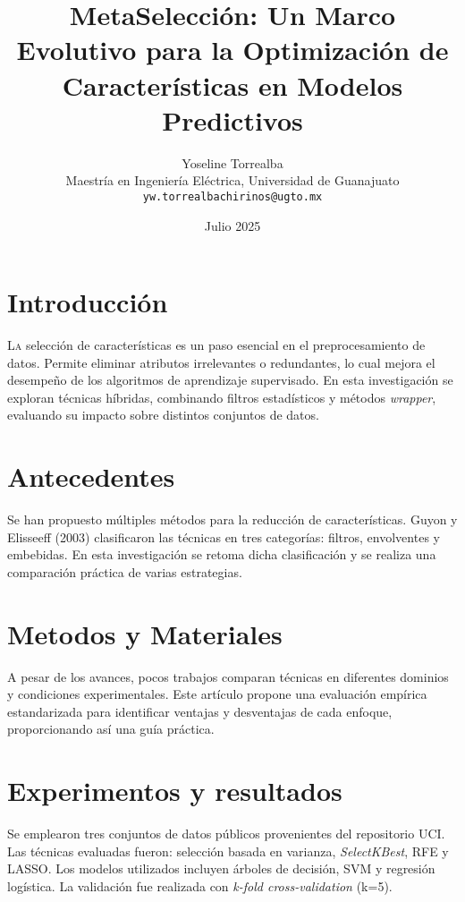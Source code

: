 \documentclass[twocolumn]{article}
\title{\textbf{MetaSelección: Un Marco Evolutivo para la Optimización de Características en Modelos Predictivos}}
\author{
Yoseline Torrealba\\
Maestría en Ingeniería Eléctrica, Universidad de Guanajuato\\
\texttt{yw.torrealbachirinos@ugto.mx}
}
\date{Julio 2025}
\begin{document}

\section{Introducción}
\lettrine{L}{a} selección de características es un paso esencial en el preprocesamiento de datos. Permite eliminar atributos irrelevantes o redundantes, lo cual mejora el desempeño de los algoritmos de aprendizaje supervisado. En esta investigación se exploran técnicas híbridas, combinando filtros estadísticos y métodos \textit{wrapper}, evaluando su impacto sobre distintos conjuntos de datos.

\section{Antecedentes}
Se han propuesto múltiples métodos para la reducción de características. Guyon y Elisseeff (2003) clasificaron las técnicas en tres categorías: filtros, envolventes y embebidas. En esta investigación se retoma dicha clasificación y se realiza una comparación práctica de varias estrategias.

\section{Metodos y Materiales}
A pesar de los avances, pocos trabajos comparan técnicas en diferentes dominios y condiciones experimentales. Este artículo propone una evaluación empírica estandarizada para identificar ventajas y desventajas de cada enfoque, proporcionando así una guía práctica.

\section{Experimentos y resultados}
Se emplearon tres conjuntos de datos públicos provenientes del repositorio UCI. Las técnicas evaluadas fueron: selección basada en varianza, \textit{SelectKBest}, RFE y LASSO. Los modelos utilizados incluyen árboles de decisión, SVM y regresión logística. La validación fue realizada con \textit{k-fold cross-validation} (k=5).
\end{document}
